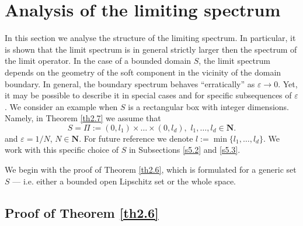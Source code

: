 \documentclass[11pt]{article}
\newcommand\e {\varepsilon}
\newcommand\N{\mathbf{N}}
\theoremstyle{remark}
\begin{document}
\section{Analysis of the limiting spectrum } \label{s:6}

 In this section we analyse the structure of the limiting spectrum.  In particular, it is shown that the limit spectrum is in general strictly larger then the spectrum of the limit operator.  In the case of a bounded domain $S$, the limit spectrum depends on the geometry of the soft component in the vicinity of the domain boundary. In general, the boundary spectrum behaves ``erratically'' as $\e\to 0$. Yet, it may be possible to describe it in special cases and for specific subsequences of $\e$.  We consider an example when $S$ is a rectangular box with integer dimensions. Namely, in Theorem \ref{th2.7} we assume that
\begin{equation}\label{69}
	S=\Pi:=(0,l_1)\times \dots \times (0,l_d),\,\,l_1,\dots,l_d \in \N.
\end{equation}
and $\e = 1/N$, $N\in \N$. For future reference we denote $l:=\min\{l_1,\dots,l_d\}.$ We work with this specific choice of $S$ in Subsections \ref{s5.2} and \ref{s5.3}. 

We begin with the proof of Theorem \ref{th2.6}, which is formulated for a generic set $S$ --- i.e. either a bounded open Lipschitz set or the whole space.





	










\subsection{Proof of Theorem \ref{th2.6}}
\end{document}
